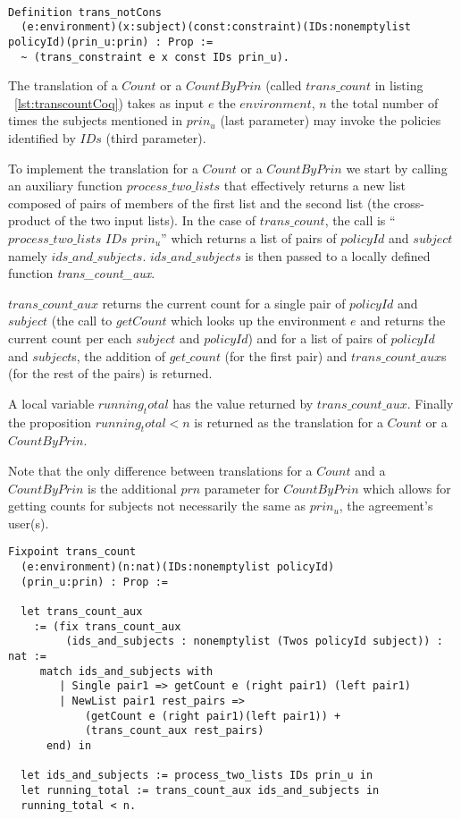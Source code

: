 \begin{lstlisting}

Definition trans_notCons
  (e:environment)(x:subject)(const:constraint)(IDs:nonemptylist policyId)(prin_u:prin) : Prop :=
  ~ (trans_constraint e x const IDs prin_u).
\end{lstlisting}




The translation of a $Count$ or a $CountByPrin$ (called $trans\_count$ in listing ~\ref{lst:transcountCoq}) takes as input $e$ the $environment$, $n$ the total number of times the subjects mentioned in $prin_{u}$ (last parameter) may invoke the policies identified by $IDs$ (third parameter).

To implement the translation for a $Count$ or a $CountByPrin$ we start by calling an auxiliary function $process\_two\_lists$ that effectively returns a new list composed of pairs of members of the first list and the second list (the cross-product of the two input lists). In the case of $trans\_count$, the call is ``$process\_two\_lists$ $IDs$ $prin_u$'' which returns a list of pairs of $policyId$ and $subject$ namely $ids\_and\_subjects$. $ids\_and\_subjects$ is then passed to a locally defined function \emph{trans_count_aux}.

$trans\_count\_aux$ returns the current count for a single pair of $policyId$ and $subject$ (the call to $getCount$ which looks up the environment $e$ and returns the current count per each $subject$ and $policyId$) and for a list of pairs of $policyId$ and $subject$s, the addition of $get\_count$ (for the first pair) and $trans\_count\_aux$s (for the rest of the pairs) is returned. 

A local variable $running_total$ has the value returned by $trans\_count\_aux$. Finally the proposition $running_total < n$ is returned as the translation for a $Count$ or a $CountByPrin$.

Note that the only difference between translations for a $Count$ and a $CountByPrin$ is the additional $prn$ parameter for $CountByPrin$ which allows for getting counts for subjects not necessarily the same as $prin_{u}$, the agreement's user(s).

\begin{minipage}[c]{0.95\textwidth}
\begin{lstlisting}
Fixpoint trans_count 
  (e:environment)(n:nat)(IDs:nonemptylist policyId)
  (prin_u:prin) : Prop := 

  let trans_count_aux 
    := (fix trans_count_aux
         (ids_and_subjects : nonemptylist (Twos policyId subject)) : nat :=
     match ids_and_subjects with
        | Single pair1 => getCount e (right pair1) (left pair1)
        | NewList pair1 rest_pairs =>
            (getCount e (right pair1)(left pair1)) +
            (trans_count_aux rest_pairs)
      end) in
  
  let ids_and_subjects := process_two_lists IDs prin_u in
  let running_total := trans_count_aux ids_and_subjects in
  running_total < n.
\end{lstlisting}
\end{minipage}